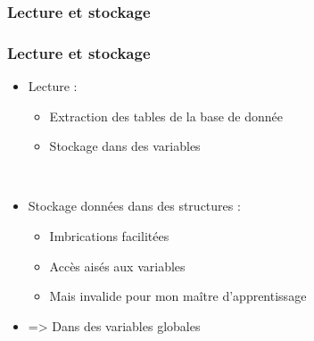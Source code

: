 \subsubsection{Lecture et stockage}

\begin{frame}
	\frametitle{Lecture et stockage}
	
	\begin{itemize}
		\item Lecture :
			\begin{itemize}
				\item Extraction des tables de la base de donnée
				\item Stockage dans des variables
			\end{itemize}~
			
		\item Stockage données dans des structures :
			\begin{itemize}
				\item Imbrications facilitées
				\item Accès aisés aux variables\sautligne
				
				\item Mais invalide pour mon maître d'apprentissage
			\end{itemize}
			
		\item => Dans des variables globales
	\end{itemize}
\end{frame}
